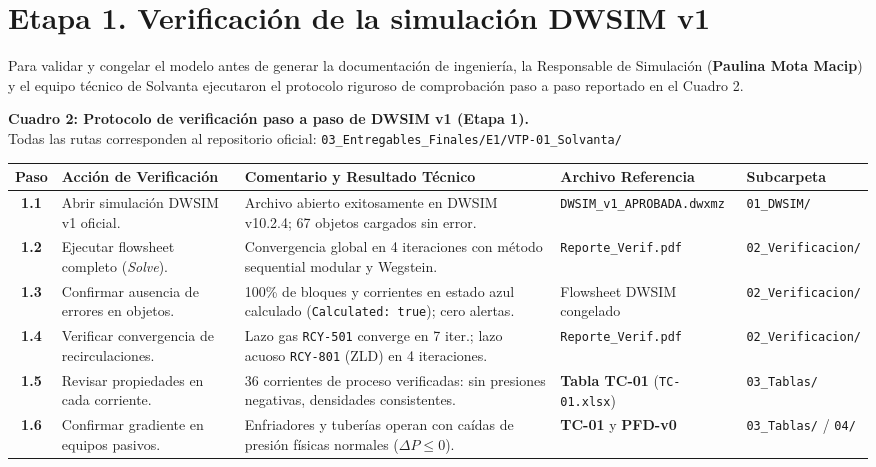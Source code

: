 \documentclass[11pt,letterpaper]{article}
\begin{document}
\section{Etapa 1. Verificación de la simulación DWSIM v1}

Para validar y congelar el modelo antes de generar la documentación de ingeniería, la Responsable de Simulación (\textbf{Paulina Mota Macip}) y el equipo técnico de Solvanta ejecutaron el protocolo riguroso de comprobación paso a paso reportado en el Cuadro 2.

\begin{center}
\footnotesize
\setlength{\tabcolsep}{3.5pt}
\renewcommand{\arraystretch}{0.96}
\textbf{Cuadro 2: Protocolo de verificación paso a paso de DWSIM v1 (Etapa 1).}\\[2pt]
{\scriptsize Todas las rutas corresponden al repositorio oficial: \texttt{03\_Entregables\_Finales/E1/VTP-01\_Solvanta/}}\\[3pt]
\begin{tabularx}{\textwidth}{cp{2.6cm}Xp{3.2cm}p{2.0cm}}
\toprule
\textbf{Paso} & \textbf{Acción de Verificación} & \textbf{Comentario y Resultado Técnico} & \textbf{Archivo Referencia} & \textbf{Subcarpeta} \\
\midrule
\textbf{1.1} & Abrir simulación DWSIM v1 oficial. & Archivo abierto exitosamente en DWSIM v10.2.4; 67 objetos cargados sin error. & {\scriptsize\texttt{DWSIM\_v1\_APROBADA.dwxmz}} & \texttt{01\_DWSIM/} \\
\textbf{1.2} & Ejecutar flowsheet completo (\textit{Solve}). & Convergencia global en 4 iteraciones con método sequential modular y Wegstein. & {\scriptsize\texttt{Reporte\_Verif.pdf}} & \texttt{02\_Verificacion/} \\
\textbf{1.3} & Confirmar ausencia de errores en objetos. & 100\% de bloques y corrientes en estado azul calculado (\texttt{Calculated: true}); cero alertas. & Flowsheet DWSIM congelado & \texttt{02\_Verificacion/} \\
\textbf{1.4} & Verificar convergencia de recirculaciones. & Lazo gas \texttt{RCY-501} converge en 7 iter.; lazo acuoso \texttt{RCY-801} (ZLD) en 4 iteraciones. & {\scriptsize\texttt{Reporte\_Verif.pdf}} & \texttt{02\_Verificacion/} \\
\textbf{1.5} & Revisar propiedades en cada corriente. & 36 corrientes de proceso verificadas: sin presiones negativas, densidades consistentes. & \textbf{Tabla TC-01} (\texttt{TC-01.xlsx}) & \texttt{03\_Tablas/} \\
\textbf{1.6} & Confirmar gradiente en equipos pasivos. & Enfriadores y tuberías operan con caídas de presión físicas normales ($\Delta P \le 0$). & \textbf{TC-01} y \textbf{PFD-v0} & \texttt{03\_Tablas/} / \texttt{04/} \\

\end{tabularx}
\end{center}
\end{document}
